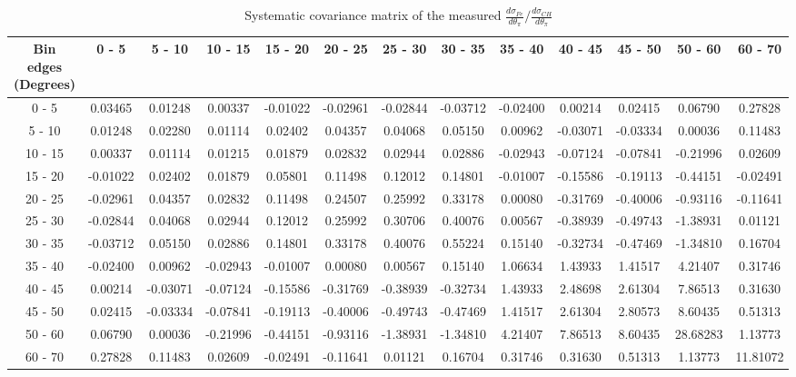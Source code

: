 \documentclass[aps,prl,twocolumn,superscriptaddress,nofootinbib]{revtex4-1}
\begin{document}
\begin{turnpage}
 \begin{table}[h!]
  \centering
  \caption{Systematic covariance matrix of the measured $\frac{d\sigma_{Fe}}{d\theta_{\pi}}/\frac{d\sigma_{CH}}{d\theta_{\pi}}$}
    \begin{tabular}{c||cccccccccccc}
      Bin edges (Degrees) & 0 - 5 & 5 - 10 & 10 - 15 & 15 - 20 & 20 - 25 & 25 - 30 & 30 - 35 & 35 - 40 & 40 - 45 & 45 - 50 & 50 - 60 & 60 - 70 \\
\hline \hline
        0 - 5 &  0.03465 &  0.01248 &  0.00337 & -0.01022 & -0.02961 & -0.02844 & -0.03712 & -0.02400 &  0.00214 &  0.02415 &  0.06790 &  0.27828 \\
       5 - 10 &  0.01248 &  0.02280 &  0.01114 &  0.02402 &  0.04357 &  0.04068 &  0.05150 &  0.00962 & -0.03071 & -0.03334 &  0.00036 &  0.11483 \\
      10 - 15 &  0.00337 &  0.01114 &  0.01215 &  0.01879 &  0.02832 &  0.02944 &  0.02886 & -0.02943 & -0.07124 & -0.07841 & -0.21996 &  0.02609 \\
      15 - 20 & -0.01022 &  0.02402 &  0.01879 &  0.05801 &  0.11498 &  0.12012 &  0.14801 & -0.01007 & -0.15586 & -0.19113 & -0.44151 & -0.02491 \\
      20 - 25 & -0.02961 &  0.04357 &  0.02832 &  0.11498 &  0.24507 &  0.25992 &  0.33178 &  0.00080 & -0.31769 & -0.40006 & -0.93116 & -0.11641 \\
      25 - 30 & -0.02844 &  0.04068 &  0.02944 &  0.12012 &  0.25992 &  0.30706 &  0.40076 &  0.00567 & -0.38939 & -0.49743 & -1.38931 &  0.01121 \\
      30 - 35 & -0.03712 &  0.05150 &  0.02886 &  0.14801 &  0.33178 &  0.40076 &  0.55224 &  0.15140 & -0.32734 & -0.47469 & -1.34810 &  0.16704 \\
      35 - 40 & -0.02400 &  0.00962 & -0.02943 & -0.01007 &  0.00080 &  0.00567 &  0.15140 &  1.06634 &  1.43933 &  1.41517 &  4.21407 &  0.31746 \\
      40 - 45 &  0.00214 & -0.03071 & -0.07124 & -0.15586 & -0.31769 & -0.38939 & -0.32734 &  1.43933 &  2.48698 &  2.61304 &  7.86513 &  0.31630 \\
      45 - 50 &  0.02415 & -0.03334 & -0.07841 & -0.19113 & -0.40006 & -0.49743 & -0.47469 &  1.41517 &  2.61304 &  2.80573 &  8.60435 &  0.51313 \\
      50 - 60 &  0.06790 &  0.00036 & -0.21996 & -0.44151 & -0.93116 & -1.38931 & -1.34810 &  4.21407 &  7.86513 &  8.60435 & 28.68283 &  1.13773 \\
      60 - 70 &  0.27828 &  0.11483 &  0.02609 & -0.02491 & -0.11641 &  0.01121 &  0.16704 &  0.31746 &  0.31630 &  0.51313 &  1.13773 & 11.81072 \\
    \end{tabular}
  \label{tablecov:Fe_Systematic_ThetaPi}
  \end{table}
\end{turnpage}
\end{document}
